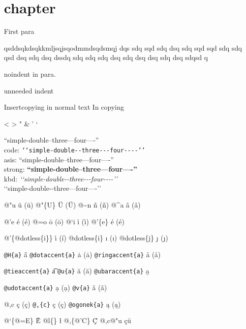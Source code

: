 \documentclass{book}
\newcommand\Texinfocommandstyletextkbd[1]{{\ttfamily\textsl{#1}}}%
\renewcommand{\_}{\Texinfounderscore\discretionary{}{}{}}
\begin{document}
\chapter{{chapter}}
\label{anchor:chapter}%

First para

\noindent{}qsddsqkdsqkkmljsqjsqodmmdsqdsmqj dqs sdq sqd sdq dsq sdq sqd sqd sdq sdq 
qsd dsq sdq dsq dssdq sdq sdq sdq dsq sdq dsq dsq sdq dsq sdqsd q

\noindent{}noindent in para.

unneeded indent

Insertcopying in normal text
In copying

<
>
"
\&
'
`

``simple-double--three---four----''\leavevmode{}\\
code: \texttt{{`}{`}simple-double{-}{-}three{-}{-}{-}four{-}{-}{-}-{'}{'}} \leavevmode{}\\
asis: ``simple-double--three---four----'' \leavevmode{}\\
strong: \textbf{``simple-double--three---four----''} \leavevmode{}\\
kbd: \Texinfocommandstyletextkbd{{`}{`}simple-double{-}{-}three{-}{-}{-}four{-}{-}{-}-{'}{'}} \leavevmode{}\\

`\hbox{}`simple-double-\hbox{}-three---four----'\hbox{}'\leavevmode{}\\

%
%
%
%

@"u \"{u} (ü)
@"\{U\} \"{U} (Ü) 
@\~{}n \~{n} (ñ)
@\^{}a \^{a} (â)

@'e \'{e} (é)
@=o \={o} (ō)
@`i \`{i} (ì)
@'\{e\} \'{e} (é)

@'\{@dotless\{i\}\} \'{\i{}} (í)
@dotless\{i\} \i{} (ı)
@dotless\{j\} \j{} (ȷ)

\texttt{@H\{a\}} \H{a}
\texttt{@dotaccent\{a\}} \.{a} (ȧ)
\texttt{@ringaccent\{a\}} \r{a} (å)

\texttt{@tieaccent\{a\}} \t{a}
\texttt{@u\{a\}} \u{a} (ă)
\texttt{@ubaraccent\{a\}} \b{a}

\texttt{@udotaccent\{a\}} \d{a} (ạ)
\texttt{@v\{a\}} \v{a} (ǎ)

@,c \c{c} (ç)
\texttt{@,\{c\}} \c{c} (ç)
\texttt{@ogonek\{a\}} \k{a} (ą)

@`\{@=E\} \`{\={E}}
@l\{\} \l{}
@,\{@'C\} \c{\'{C}}
@,c@"u \c{c}\"{u} \leavevmode{}\\
\end{document}
